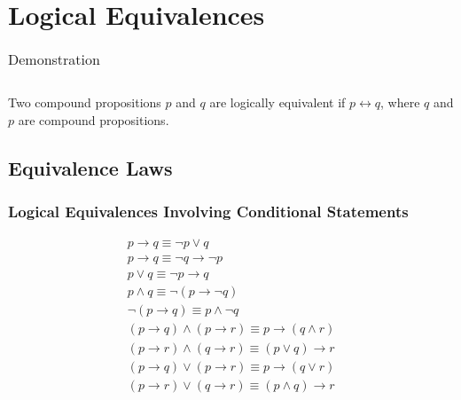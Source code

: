 \documentclass[12pt letter]{report}
\begin{document}
\chapter{Logical Equivalences}




\begin{table}[h!]
	\caption{Demonstration}\label{tab:}
	\begin{center}
		\begin{tabular}{|c c|c|}
			\hline
			\\ [0.5ex]
			\hline
			\hline

			\hline
		\end{tabular}
	\end{center}
\end{table}

Two compound propositions $p$ and $q$ are logically equivalent if $p \leftrightarrow q$, where $q$ and $p$ are compound propositions.

\section{Equivalence Laws}

\subsection{Logical Equivalences Involving Conditional Statements}

\begin{align*}
	p \to q \equiv \neg p \vee q                                                                  \\
	p \to q \equiv \neg q \to \neg p                                                              \\
	p \vee q \equiv \neg p \to q                                                                  \\
	p \wedge q \equiv \neg \left( p \to \neg q  \right)                                           \\
	\neg  \left( p \to q \right) \equiv p \wedge \neg q                                           \\
	\left( p \to q  \right)  \wedge \left( p \to r \right) \equiv p \to \left( q \wedge r \right) \\
	\left( p \to r \right)  \wedge \left( q \to r \right)  \equiv \left( p \vee q \right) \to r   \\
	\left( p \to q  \right) \vee \left( p \to r \right) \equiv p \to \left( q \vee r \right)      \\
	\left( p \to r \right) \vee \left( q \to r \right) \equiv \left( p \wedge q \right) \to r     \\
\end{align*}
\end{document}

